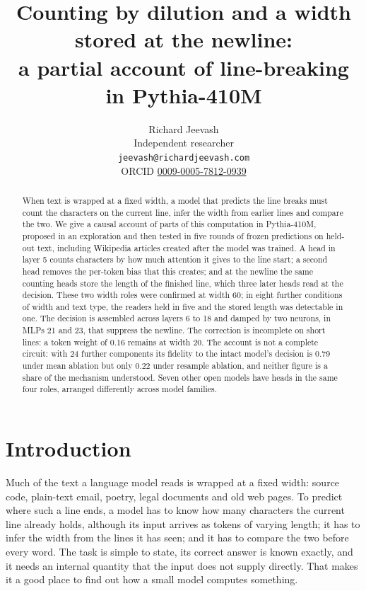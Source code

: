 \documentclass[11pt,a4paper]{article}
\title{Counting by dilution and a width stored at the newline:\\a partial account of line-breaking in Pythia-410M}
\author{Richard Jeevash\\
Independent researcher\\
\texttt{jeevash@richardjeevash.com}\\
ORCID \href{https://orcid.org/0009-0005-7812-0939}{0009-0005-7812-0939}}
\date{}
\begin{document}
\maketitle

\begin{abstract}
When text is wrapped at a fixed width, a model that predicts the line breaks must count the characters on the current line, infer the width from earlier lines and compare the two. We give a causal account of parts of this computation in Pythia-410M, proposed in an exploration and then tested in five rounds of frozen predictions on held-out text, including Wikipedia articles created after the model was trained. A head in layer 5 counts characters by how much attention it gives to the line start; a second head removes the per-token bias that this creates; and at the newline the same counting heads store the length of the finished line, which three later heads read at the decision. These two width roles were confirmed at width 60; in eight further conditions of width and text type, the readers held in five and the stored length was detectable in one. The decision is assembled across layers 6 to 18 and damped by two neurons, in MLPs 21 and 23, that suppress the newline. The correction is incomplete on short lines: a token weight of 0.16 remains at width 20. The account is not a complete circuit: with 24 further components its fidelity to the intact model's decision is 0.79 under mean ablation but only 0.22 under resample ablation, and neither figure is a share of the mechanism understood. Seven other open models have heads in the same four roles, arranged differently across model families.
\end{abstract}

\section{Introduction}

Much of the text a language model reads is wrapped at a fixed width: source code, plain-text email, poetry, legal documents and old web pages. To predict where such a line ends, a model has to know how many characters the current line already holds, although its input arrives as tokens of varying length; it has to infer the width from the lines it has seen; and it has to compare the two before every word. The task is simple to state, its correct answer is known exactly, and it needs an internal quantity that the input does not supply directly. That makes it a good place to find out how a small model computes something.
\end{document}
